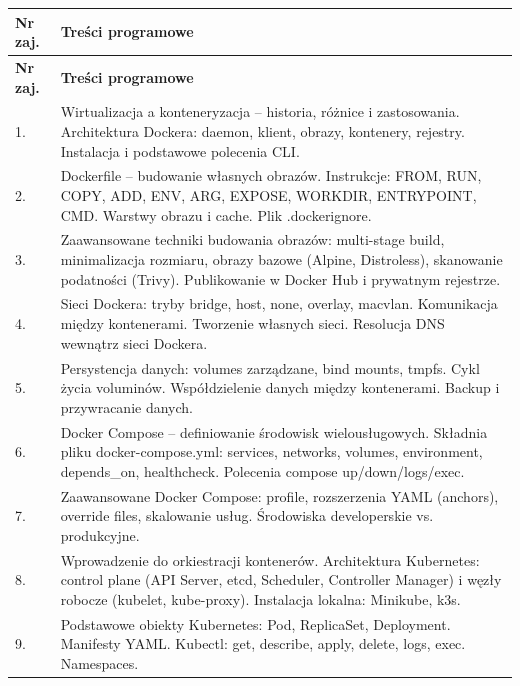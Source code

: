 \documentclass[12pt, a4paper]{article}
\newcommand{\thdrule}{\noalign{\global\setlength{\extrarowheight}{0pt}}}
\newcommand{\thdend}{\noalign{\global\setlength{\extrarowheight}{3pt}}}
\begin{document}
{\scriptsize
\begin{longtable}{m{1.5cm}m{14.5cm}}
\thdrule\toprule
\rowcolor{pjatkRed} {\color{white}\textbf{Nr zaj.}} & {\color{white}\textbf{Treści programowe}} \\
\midrule\thdend
\endfirsthead
\thdrule\toprule
\rowcolor{pjatkRed} {\color{white}\textbf{Nr zaj.}} & {\color{white}\textbf{Treści programowe}} \\
\midrule\thdend
\endhead
  \rowcolor{tableRowLight} 1. & Wirtualizacja a konteneryzacja – historia, różnice i zastosowania. Architektura Dockera: daemon, klient, obrazy, kontenery, rejestry. Instalacja i podstawowe polecenia CLI. \\
  \rowcolor{tableRowAlt} 2. & Dockerfile – budowanie własnych obrazów. Instrukcje: FROM, RUN, COPY, ADD, ENV, ARG, EXPOSE, WORKDIR, ENTRYPOINT, CMD. Warstwy obrazu i cache. Plik .dockerignore. \\
  \rowcolor{tableRowLight} 3. & Zaawansowane techniki budowania obrazów: multi-stage build, minimalizacja rozmiaru, obrazy bazowe (Alpine, Distroless), skanowanie podatności (Trivy). Publikowanie w Docker Hub i prywatnym rejestrze. \\
  \rowcolor{tableRowAlt} 4. & Sieci Dockera: tryby bridge, host, none, overlay, macvlan. Komunikacja między kontenerami. Tworzenie własnych sieci. Resolucja DNS wewnątrz sieci Dockera. \\
  \rowcolor{tableRowLight} 5. & Persystencja danych: volumes zarządzane, bind mounts, tmpfs. Cykl życia voluminów. Współdzielenie danych między kontenerami. Backup i przywracanie danych. \\
  \rowcolor{tableRowAlt} 6. & Docker Compose – definiowanie środowisk wielousługowych. Składnia pliku docker-compose.yml: services, networks, volumes, environment, depends\_on, healthcheck. Polecenia compose up/down/logs/exec. \\
  \rowcolor{tableRowLight} 7. & Zaawansowane Docker Compose: profile, rozszerzenia YAML (anchors), override files, skalowanie usług. Środowiska developerskie vs. produkcyjne. \\
  \rowcolor{tableRowAlt} 8. & Wprowadzenie do orkiestracji kontenerów. Architektura Kubernetes: control plane (API Server, etcd, Scheduler, Controller Manager) i węzły robocze (kubelet, kube-proxy). Instalacja lokalna: Minikube, k3s. \\
  \rowcolor{tableRowLight} 9. & Podstawowe obiekty Kubernetes: Pod, ReplicaSet, Deployment. Manifesty YAML. Kubectl: get, describe, apply, delete, logs, exec. Namespaces. \\

\end{longtable}}
\end{document}
